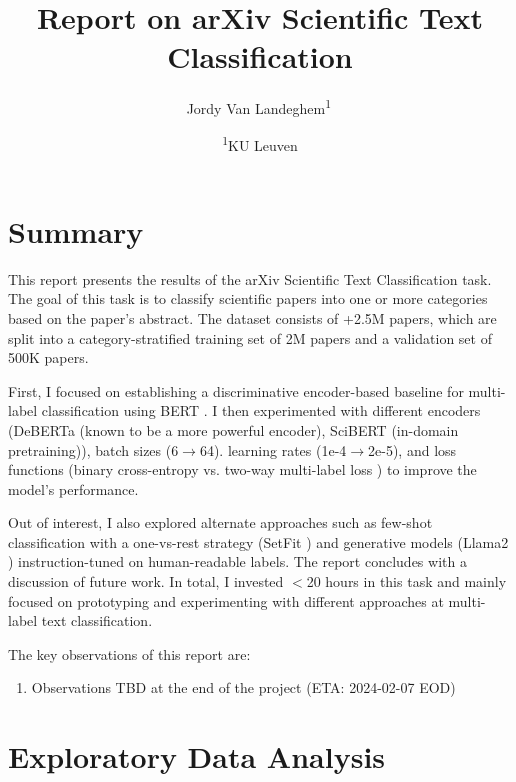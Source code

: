 \documentclass[11pt,letterpaper]{article}
\begin{document}
\title{Report on arXiv Scientific Text Classification} %

\newcommand{\superaffil}[2]{\textsuperscript{#1}\,#2}

\author{
\small Jordy Van Landeghem\superaffil{1}
  \and
  \footnotesize{
    \textsuperscript{1}KU Leuven
  }
}

\maketitle

\section{Summary}

This report presents the results of the arXiv Scientific Text Classification task. The goal of this task is to classify scientific papers into one or more categories based on the paper's abstract. The dataset consists of +2.5M papers, which are split into a category-stratified training set of 2M papers and a validation set of 500K papers.

First, I focused on establishing a discriminative encoder-based baseline for multi-label classification using BERT \cite{devlin2018bert}.
I then experimented with different encoders (DeBERTa \cite{he2020deberta} (known to be a more powerful encoder), SciBERT \cite{maheshwari2021scibert} (in-domain pretraining)), batch sizes (6$\to$64). learning rates (1e-4$\to$2e-5), and loss functions (binary cross-entropy vs. two-way multi-label loss \cite{kobayashi2023two}) to improve the model's performance.

Out of interest, I also explored alternate approaches such as few-shot classification with a one-vs-rest strategy (SetFit \cite{tunstall2022efficient}) and generative models (Llama2 \cite{touvron2023llama}) instruction-tuned on human-readable labels. The report concludes with a discussion of future work. In total, I invested $<$20 hours in this task and mainly focused on prototyping and experimenting with different approaches at multi-label text classification.

\noindent The key observations of this report are:
\begin{enumerate}
  [label=\Roman*.,leftmargin=2\parindent]
  \item  Observations TBD at the end of the project (ETA: 2024-02-07 EOD)
\end{enumerate}

\section{Exploratory Data Analysis}
\end{document}
